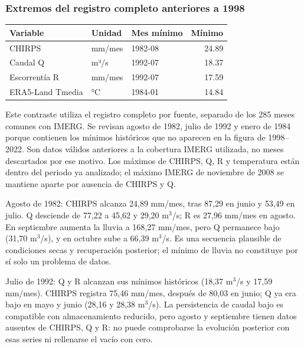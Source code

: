 \documentclass[10pt,a4paper]{article}
\begin{document}
\subsubsection*{Extremos del registro completo anteriores a 1998}
\begin{center}{\small
\begin{center}
\begin{tabular}{lllr}
\toprule
Variable & Unidad & Mes mínimo & Mínimo \\
\midrule
CHIRPS & mm/mes & 1982-08 & 24.89 \\
Caudal Q & m³/s & 1992-07 & 18.37 \\
Escorrentía R & mm/mes & 1992-07 & 17.59 \\
ERA5-Land Tmedia & °C & 1984-01 & 14.84 \\
\bottomrule
\end{tabular}
\end{center}
}\end{center}
Este contraste utiliza el registro completo por fuente, separado de los 285 meses comunes con IMERG. Se revisan agosto de 1982, julio de 1992 y enero de 1984 porque contienen los mínimos históricos que no aparecen en la figura de 1998--2022. Son datos válidos anteriores a la cobertura IMERG utilizada, no meses descartados por ese motivo. Los máximos de CHIRPS, Q, R y temperatura están dentro del periodo ya analizado; el máximo IMERG de noviembre de 2008 se mantiene aparte por ausencia de CHIRPS y Q.

Agosto de 1982: CHIRPS alcanza 24,89 mm/mes, tras 87,29 en junio y 53,49 en julio. Q desciende de 77,22 a 45,62 y 29,20 m$^3$/s; R es 27,96 mm/mes en agosto. En septiembre aumenta la lluvia a 168,27 mm/mes, pero Q permanece bajo (31,70 m$^3$/s), y en octubre sube a 66,39 m$^3$/s. Es una secuencia plausible de condiciones secas y recuperación posterior; el mínimo de lluvia no constituye por sí solo un problema de datos.

Julio de 1992: Q y R alcanzan sus mínimos históricos (18,37 m$^3$/s y 17,59 mm/mes). CHIRPS registra 75,46 mm/mes, después de 80,03 en junio; Q ya era bajo en mayo y junio (28,16 y 28,38 m$^3$/s). La persistencia de caudal bajo es compatible con almacenamiento reducido, pero agosto y septiembre tienen datos ausentes de CHIRPS, Q y R: no puede comprobarse la evolución posterior con esas series ni rellenarse el vacío con cero.
\end{document}
